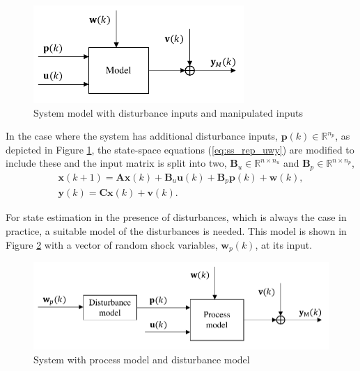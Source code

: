 \begin{figure}[ht]
	\centering
	\includegraphics[width=8cm]{images/model_diag_upwvy.pdf}
	\caption{System model with disturbance inputs and manipulated inputs}
	\label{fig:model_diag_upwvy}
\end{figure}
In the case where the system has additional disturbance inputs, $\mathbf{p}(k) \in \mathbb{R}^{n_p}$, as depicted in Figure \ref{fig:model_diag_upwvy}, the state-space equations (\ref{eq:ss_rep_uwy}) are modified to include these and the input matrix is split into two, $\mathbf{B}_u \in \mathbb{R}^{n \times n_u}$ and $\mathbf{B}_p \in \mathbb{R}^{n \times n_p}$,
\begin{equation} \label{eq:ss_rep_upwy}
	\begin{aligned}
		\mathbf{x}(k+1) = \mathbf{A} \mathbf{x}(k) + \mathbf{B}_u \mathbf{u}(k) + \mathbf{B}_p \mathbf{p}(k) + \mathbf{w}(k), \\
		\mathbf{y}(k) = \mathbf{C} \mathbf{x}(k) + \mathbf{v}(k).
	\end{aligned}
\end{equation}

For state estimation in the presence of disturbances, which is always the case in practice, a suitable model of the disturbances is needed. This model is shown in Figure \ref{fig:model_diag_wpupwvy} with a vector of random shock variables, $\mathbf{w}_p(k)$, at its input.
%
\begin{figure}[ht]
	\centering
	\includegraphics[width=12.5cm]{images/model_diag_wpupwvy.pdf}
	\caption{System with process model and disturbance model}
	\label{fig:model_diag_wpupwvy}
\end{figure}

